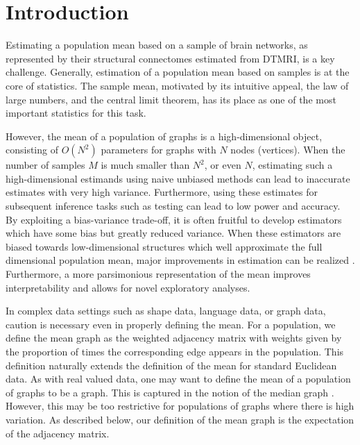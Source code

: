 \documentclass[journal,twoside,web]{ieeecolor}
\begin{document}
\section{Introduction}\label{sec:intro}

Estimating a population mean based on a sample of brain networks, as represented by their structural connectomes estimated from DTMRI, is a key challenge.
Generally, estimation of a population mean based on samples is at the core of statistics.
The sample mean, motivated by its intuitive appeal, the law of large numbers, and the central limit theorem, has its place as one of the most important statistics for this task.

However, the mean of a population of graphs is a high-dimensional object, consisting of $O(N^2)$ parameters for graphs with $N$ nodes (vertices).
When the number of samples $M$ is much smaller than $N^2$, or even $N$, estimating such a high-dimensional estimands using naive unbiased methods can lead to inaccurate estimates with very high variance.
Furthermore, using these estimates for subsequent inference tasks such as testing can lead to low power and accuracy.
By exploiting a bias-variance trade-off, it is often fruitful to develop estimators which have some bias but greatly reduced variance.
When these estimators are biased towards low-dimensional structures which well approximate the full dimensional population mean, major improvements in estimation can be realized \cite{trunk1979problem}.
Furthermore, a more parsimonious representation of the mean improves interpretability and allows for novel exploratory analyses.



In complex data settings such as shape data, language data, or graph data, caution is necessary even in properly defining the mean.
For a population, we define the mean graph as the weighted adjacency matrix with weights given by the proportion of times the corresponding edge appears in the population.
This definition naturally extends the definition of the mean for standard Euclidean data.
As with real valued data, one may want to define the mean of a population of graphs to be a graph.
This is captured in the notion of the median graph \cite{jiang2001median}. However, this may be too restrictive for populations of graphs where there is high variation.
As described below, our definition of the mean graph is the expectation of the adjacency matrix.
\end{document}
